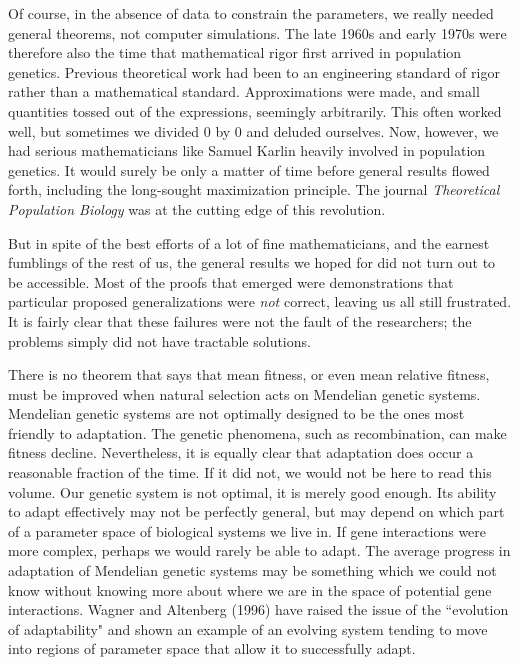 \documentclass[12pt]{article}
\begin{document}
Of course, in the absence of data to constrain the parameters, we really needed
general theorems, not computer simulations.  The late 1960s and early 1970s
were therefore also the time that mathematical rigor first arrived in
population genetics.  Previous theoretical work had been to an engineering
standard of
rigor rather than a mathematical standard.  Approximations were made, and
small quantities tossed out of the expressions, seemingly arbitrarily.  This
often worked well, but sometimes we divided 0 by 0 and deluded ourselves.
Now, however, we had serious mathematicians
like Samuel Karlin heavily involved in population genetics.  It would surely
be only a matter of time before general results flowed forth, including the
long-sought maximization principle.  The journal {\it Theoretical Population
Biology} was at the cutting edge of this revolution.

But in spite of the best efforts of a lot of fine mathematicians, and
the earnest fumblings of the rest of us, the general results we hoped for did
not turn
out to be accessible.
Most of the
proofs that
emerged were demonstrations that particular proposed generalizations were {\it not}
correct, leaving us all still frustrated.  It is fairly clear that these
failures were not the fault of the researchers; the problems simply
did not have tractable solutions.

There is no theorem that says that mean fitness, or even mean relative
fitness, must be improved when natural selection acts on Mendelian genetic
systems.  Mendelian genetic systems are not optimally designed to be the
ones most friendly to adaptation.  The genetic phenomena, such as
recombination, can make fitness decline.  Nevertheless, it is equally
clear that adaptation does occur a reasonable fraction of the time.  If it
did not, we would not be here to read this volume.  Our genetic system is
not optimal, it is merely good enough.  Its ability to adapt effectively
may not be
perfectly general, but may depend on which part of a parameter space of biological
systems we live in.  If gene interactions were more complex, perhaps we would
rarely be able to adapt.  The average progress in adaptation of Mendelian genetic
systems may be something which we could not know without
knowing more about where we are in the space of potential gene interactions.
Wagner and Altenberg (1996) have raised the issue of the ``evolution of adaptability"
and shown an example of an evolving system tending to move into
regions of parameter space that allow it to successfully adapt.
\end{document}
